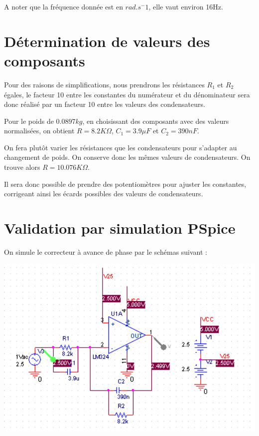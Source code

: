 \documentclass[11pt, french]{article} %
\begin{document}
A noter que la fréquence donnée est en $rad.s^-1$, elle vaut environ 16Hz. 
\section{Détermination de valeurs des composants}

Pour des raisons de simplifications, nous prendrons les résistances $R_1$ et $R_2$ égales, le facteur 10 entre les constantes du numérateur et du dénominateur sera donc réalisé par un facteur 10 entre les valeurs des condensateurs. 



Pour le poids de $0.0897 kg$, en choisissant des composants avec des valeurs normalisées, on obtient $R=8.2 K\Omega$, $C_1=3.9 \mu F$ et $C_2=390 nF$. 



On fera plutôt varier les résistances que les condensateurs pour s'adapter au changement de poids. On conserve donc les mêmes valeurs de condensateurs. On trouve alors $R=10.076 K\Omega$. 



Il sera donc possible de prendre des potentiomètres pour ajuster les constantes, corrigeant ainsi les écards possibles des valeurs de condensateurs. 


\section{Validation par simulation PSpice}

On simule le correcteur à avance de phase par le schémas suivant : 

\begin{center}
\includegraphics[width = 15cm]{Avph/schAvph.png} 
\end{center}
\end{document}

